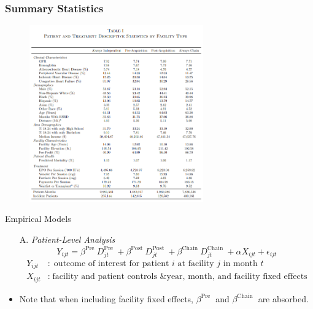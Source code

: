 \documentclass[aspectratio=169]{beamer}
\begin{document}
\begin{frame}\frametitle{Summary Statistics}
 \begin{figure}[h!]
        \centering
        \includegraphics[width=75mm]{figure3_5.png}
        \label{fig:method}
        \end{figure}
\end{frame}


\begin{frame}{Empirical Models}
\begin{itemize}
\item[A.] \textit{Patient-Level Analysis}
\begin{equation}
Y_{i j t}=\beta^{\text {Pre }} D_{j t}^{\text {Pre }}+\beta^{\text {Post }} D_{j t}^{\text {Post }}+\beta^{\text {Chain }} D_{j t}^{\text {Chain }}+\alpha X_{i j t}+\epsilon_{i j t}
\end{equation}
             \begin{align*}
                Y_{ijt}&: \; \text{outcome of interest for patient $i$ at facility $j$ in month $t$}\\
                X_{ijt}&: \; \text{facility and patient controls \& year, month, and facility fixed effects}
            \end{align*}
\item  Note that when including facility fixed effects, $\beta^{\text {Pre }}$ and $\beta^{\text {Chain }}$ are absorbed.
\end{itemize}

\end{frame}
\end{document}
